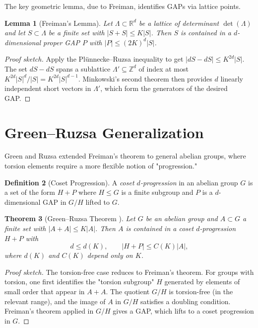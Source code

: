\documentclass[12pt,a4paper]{amsart}
\newtheorem{theorem}{Theorem}[section]
\newtheorem{lemma}[theorem]{Lemma}
\theoremstyle{definition}
\newtheorem{definition}[theorem]{Definition}
\theoremstyle{remark}
\newcommand{\Z}{\mathbb{Z}}
\newcommand{\R}{\mathbb{R}}
\begin{document}
The key geometric lemma, due to Freiman, identifies GAPs via lattice points.

\begin{lemma}[Freiman's Lemma]\label{lem:freiman_lemma}
Let $\Lambda \subset \R^d$ be a lattice of determinant $\det(\Lambda)$ and let
$S \subset \Lambda$ be a finite set with $|S + S| \leq K|S|$. Then $S$ is
contained in a $d$-dimensional proper GAP $P$ with
$|P| \leq (2K)^d |S|$.
\end{lemma}

\begin{proof}[Proof sketch]
Apply the Plünnecke--Ruzsa inequality to get $|dS - dS| \leq K^{2d}|S|$.
The set $dS - dS$ spans a sublattice $\Lambda' \subseteq \Z^d$ of index at most
$K^{2d}|S|^d / |S| = K^{2d}|S|^{d-1}$. Minkowski's second theorem then provides
$d$ linearly independent short vectors in $\Lambda'$, which form the generators of
the desired GAP.
\end{proof}

\section{Green--Ruzsa Generalization}\label{sec:green_ruzsa}

Green and Ruzsa \cite{GreenRuzsa2007} extended Freiman's theorem to general abelian
groups, where torsion elements require a more flexible notion of "progression."

\begin{definition}[Coset Progression]
A \emph{coset $d$-progression} in an abelian group $G$ is a set of the form
$H + P$ where $H \leq G$ is a finite subgroup and $P$ is a $d$-dimensional GAP in
$G/H$ lifted to $G$.
\end{definition}

\begin{theorem}[Green--Ruzsa Theorem \cite{GreenRuzsa2007}]\label{thm:green_ruzsa}
Let $G$ be an abelian group and $A \subset G$ a finite set with $|A + A| \leq K|A|$.
Then $A$ is contained in a coset $d$-progression $H + P$ with
\[
  d \leq d(K), \qquad |H + P| \leq C(K)|A|,
\]
where $d(K)$ and $C(K)$ depend only on $K$.
\end{theorem}

\begin{proof}[Proof sketch]
The torsion-free case reduces to Freiman's theorem. For groups with torsion, one
first identifies the "torsion subgroup" $H$ generated by elements of small order
that appear in $A + A$. The quotient $G/H$ is torsion-free (in the relevant range),
and the image of $A$ in $G/H$ satisfies a doubling condition. Freiman's theorem
applied in $G/H$ gives a GAP, which lifts to a coset progression in $G$.
\end{proof}
\end{document}
